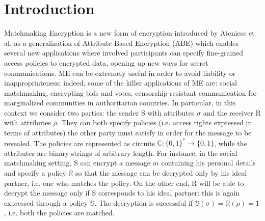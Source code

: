 \chapter{Introduction}
Matchmaking Encryption is a new form of encryption introduced by Ateniese et al. \cite{Ateniese} as a generalization of  Attribute-Based Encryption (ABE)  \cite{Sahai} which enables several new applications where involved participants can specify fine-grained access policies to encrypted data, opening up new ways for secret communications. ME can be extremely useful in order to avoid liability or inappropriateness; indeed, some of the killer applications of ME are: social matchmaking, encrypting bids and votes, censorship-resistant communication for marginalized communities in authoritarian countries.
\newline\newline
In particular, in this context we consider two parties: the sender S with attributes $\sigma$ and the receiver R with attributes $\rho$.
They can both specify policies (i.e. access rights expressed in terms of attributes) the other party must satisfy in order for the message to be revealed. The policies are represented as circuits $\mathbb{C} : \{0, 1\}^* \to \{0, 1\}$, while the attributes are binary strings of arbitrary length.
For instance, in the social matchmaking setting, S can encrypt a message $m$ containing his personal details and specify a policy $\mathbb{R}$ so that the message can be decrypted only by his ideal partner, i.e. one who matches the policy. On the other end, R will be able to decrypt the message only if S corresponds to his ideal partner: this is again expressed through a policy $\mathbb{S}$. The decryption is successful if $\mathbb{S}(\sigma) = \mathbb{R}(\rho) = 1$, i.e. both the policies are matched.

